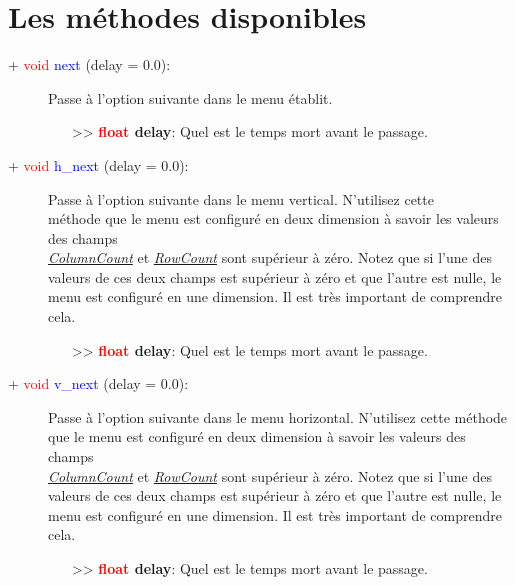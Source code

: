 \documentclass[a4paper, 11pt]{article}
\begin{document}
	\section{Les méthodes disponibles}
	\begin{description}
		\item [+ \textcolor{red}{void} \textcolor{blue}{next} (delay = 0.0):] Passe à l'option suivante dans
		le menu établit.
		\begin{itemize}
			\item [>> \textbf{\textcolor{red}{float} delay}:] Quel est le temps mort avant le passage.\\
		\end{itemize}
	\end{description}
	\begin{description}
		\item [+ \textcolor{red}{void} \textcolor{blue}{h\_next} (delay = 0.0):] Passe à l'option suivante 
		dans le menu vertical. N'utilisez cette \\méthode que le menu est configuré en deux dimension à 
		savoir les valeurs des champs \textit{\hyperlink{ccount}{\\ColumnCount}} et 
		\textit{\hyperlink{rcount}{RowCount}} sont supérieur à zéro. Notez que si l'une des valeurs de ces 
		deux champs est supérieur à zéro et que l'autre est nulle, le menu est configuré en une dimension. 
		Il est très important de comprendre cela.
		\begin{itemize}
			\item [>> \textbf{\textcolor{red}{float} delay}:] Quel est le temps mort avant le passage.\\
		\end{itemize}
	\end{description}
	\newpage \begin{description}
		\item [+ \textcolor{red}{void} \textcolor{blue}{v\_next} (delay = 0.0):] Passe à l'option suivante 
		dans le menu horizontal. N'utilisez cette méthode que le menu est configuré en deux dimension à 
		savoir les valeurs des champs \textit{\hyperlink{ccount}{\\ColumnCount}} et 
		\textit{\hyperlink{rcount}{RowCount}} sont supérieur à zéro. Notez que si l'une des valeurs de ces 
		deux champs est supérieur à zéro et que l'autre est nulle, le menu est configuré en une dimension. 
		Il est très important de comprendre cela.
		\begin{itemize}
			\item [>> \textbf{\textcolor{red}{float} delay}:] Quel est le temps mort avant le passage.\\
		\end{itemize}
	\end{description}
\end{document}
